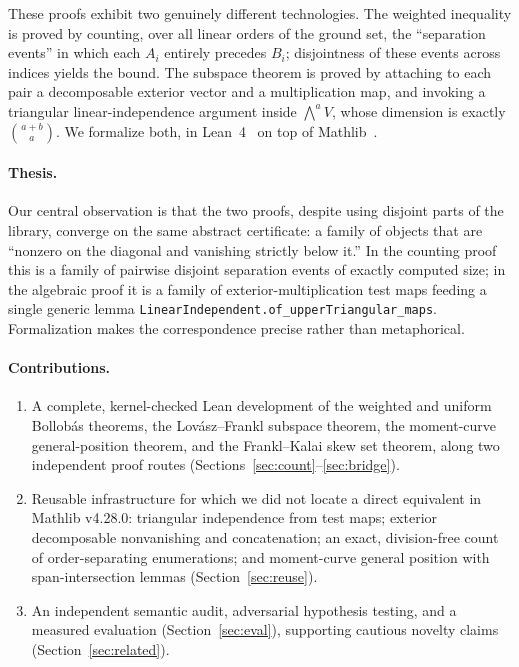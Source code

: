 \documentclass[11pt]{article}
\newcommand{\bind}[2]{\binom{#1}{#2}}
\newcommand{\wedgep}[1]{\textstyle\bigwedge^{#1}}
\begin{document}
These proofs exhibit two genuinely different technologies. The weighted inequality is
proved by counting, over all linear orders of the ground set, the ``separation events''
in which each $A_i$ entirely precedes $B_i$; disjointness of these events across indices
yields the bound. The subspace theorem is proved by attaching to each pair a
decomposable exterior vector and a multiplication map, and invoking a triangular
linear-independence argument inside $\wedgep{a} V$, whose dimension is exactly
$\bind{a+b}{a}$. We formalize both, in Lean~4~\cite{lean4} on top of
Mathlib~\cite{mathlib2020}.

\paragraph{Thesis.} Our central observation is that the two proofs, despite using
disjoint parts of the library, converge on the same abstract certificate: a family of
objects that are ``nonzero on the diagonal and vanishing strictly below it.'' In the
counting proof this is a family of pairwise disjoint separation events of exactly
computed size; in the algebraic proof it is a family of exterior-multiplication test
maps feeding a single generic lemma
\lstinline{LinearIndependent.of_upperTriangular_maps}. Formalization makes the
correspondence precise rather than metaphorical.

\paragraph{Contributions.}
\begin{enumerate}
\item A complete, kernel-checked Lean development of the weighted and uniform Bollob\'as
  theorems, the Lov\'asz--Frankl subspace theorem, the moment-curve general-position
  theorem, and the Frankl--Kalai skew set theorem, along two independent proof routes
  (Sections~\ref{sec:count}--\ref{sec:bridge}).
\item Reusable infrastructure for which we did not locate a direct equivalent in Mathlib v4.28.0: triangular
  independence from test maps; exterior decomposable nonvanishing and concatenation; an
  exact, division-free count of order-separating enumerations; and moment-curve general
  position with span-intersection lemmas (Section~\ref{sec:reuse}).
\item An independent semantic audit, adversarial hypothesis testing, and a measured
  evaluation (Section~\ref{sec:eval}), supporting cautious novelty claims
  (Section~\ref{sec:related}).
\end{enumerate}
\end{document}
